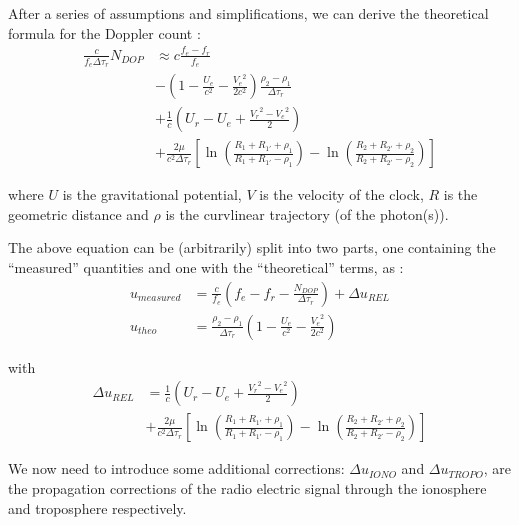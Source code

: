 After a series of assumptions and simplifications, we can derive the theoretical 
formula for the Doppler count \cite{lemoine-2016}:
\begin{equation}
    \begin{split}
        \frac{c}{f_e \Delta\tau_r} N_{DOP} & \approx c \frac{f_e - f_r}{f_e} \\
        & - (1 - \frac{U_e}{c^2} - \frac{{V_e}^2}{2 c^2}) \frac{\rho_2 - \rho_1}{\Delta\tau_r}\\
        & + \frac{1}{c} (U_r - U_e + \frac{{V_r}^2 - {V_e}^2}{2}) \\
        & + \frac{2 \mu}{c^2 \Delta\tau_r} [\ln{(\frac{R_1 + R_{1'} + \rho_1}{R_1 + R_{1'} - \rho_1})} - \ln{(\frac{R_2 + R_{2'} + \rho_2}{R_2 + R_{2'} - \rho_2})}]
    \end{split}
\end{equation}

where \(U\) is the gravitational potential, \(V\) is the velocity of the clock, \(R\) 
is the geometric distance and \(\rho\) is the curvlinear trajectory (of the photon(s)).

The above equation can be (arbitrarily) split into two parts, one containing the ``measured'' 
quantities and one with the ``theoretical'' terms, as \cite{lemoine-2016}:
\begin{subequations}\label{eq:lem12}
  \begin{align}
    u_{measured} & = \frac{c}{f_e} (f_e - f_r -
     \frac{N_{DOP}}{\Delta\tau_r}) + \Delta u_{REL} \label{eq:lem12a} \\
    u_{theo}     &= \frac{\rho_2 - \rho_1}{\Delta\tau_r} (1- \frac{U_e}{c^2} - 
      \frac{{V_e}^2}{2 c^2}) \label{eq:lem12b}
  \end{align}
\end{subequations}

with
\begin{equation}
    \begin{split}
        \Delta u_{REL} &= \frac{1}{c} (U_r - U_e + \frac{{V_r}^2 - {V_e}^2}{2}) \\
        & + \frac{2 \mu}{c^2 \Delta\tau_r} [\ln{(\frac{R_1 + R_{1'} + \rho_1}{R_1 + R_{1'} - \rho_1})} - \ln{(\frac{R_2 + R_{2'} + \rho_2}{R_2 + R_{2'} - \rho_2})}]
    \end{split}
\end{equation}

We now need to introduce some additional corrections:
\(\Delta u_{IONO}\) and \(\Delta u_{TROPO}\), are the propagation corrections of 
the radio electric signal through the ionosphere and troposphere respectively. 

